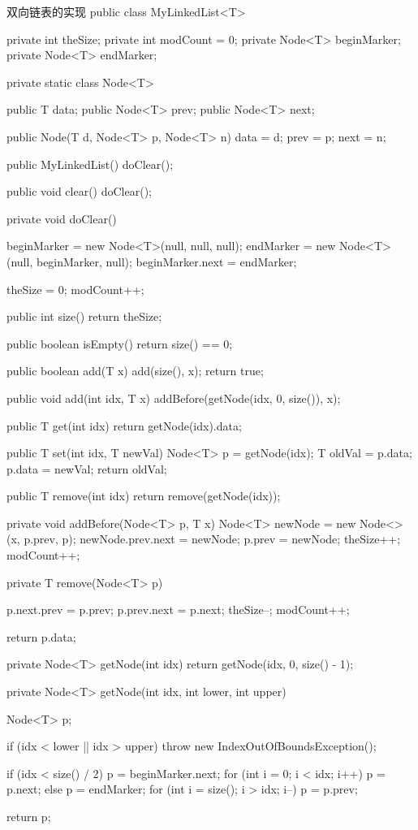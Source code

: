 \documentclass[oneside,10pt,fontset=none]{ctexbook}
\numberwithin{definition}{chapter}
\numberwithin{theorem}{chapter}
\numberwithin{lemma}{chapter}
\begin{document}
\begin{myjava}{}{双向链表的实现}{}
public class MyLinkedList<T> {
    private int theSize;
    private int modCount = 0;
    private Node<T> beginMarker;
    private Node<T> endMarker; 

    private static class Node<T> {
        public T data;
        public Node<T> prev;
        public Node<T> next;

        public Node(T d, Node<T> p, Node<T> n) {
            data = d;
            prev = p;
            next = n;
        }
    }

    public MyLinkedList() {
        doClear();
    }

    public void clear() {
        doClear();
    }

    private void doClear() {
        beginMarker = new Node<T>(null, null, null);
        endMarker = new Node<T>(null, beginMarker, null);
        beginMarker.next = endMarker;

        theSize = 0;
        modCount++;
    }

    public int size() {
        return theSize;
    }

    public boolean isEmpty() {
        return size() == 0;
    }

    public boolean add(T x) {
        add(size(), x);
        return true;
    }

    public void add(int idx, T x) {
        addBefore(getNode(idx, 0, size()), x);
    }

    public T get(int idx) {
        return getNode(idx).data;
    }

    public T set(int idx, T newVal) {
        Node<T> p = getNode(idx);
        T oldVal = p.data;
        p.data = newVal;
        return oldVal;
    }

    public T remove(int idx) {
        return remove(getNode(idx));
    }

    private void addBefore(Node<T> p, T x) {
        Node<T> newNode = new Node<>(x, p.prev, p);
        newNode.prev.next = newNode;
        p.prev = newNode;
        theSize++;
        modCount++;
    }

    private T remove(Node<T> p) {
        p.next.prev = p.prev;
        p.prev.next = p.next;
        theSize--;
        modCount++;

        return p.data;
    }
    
    private Node<T> getNode(int idx) {
        return getNode(idx, 0, size() - 1);
    }

    private Node<T> getNode(int idx, int lower, int upper) {
        Node<T> p;

        if (idx < lower || idx > upper)
            throw new IndexOutOfBoundsException();

        if (idx < size() / 2) {
            p = beginMarker.next;
            for (int i = 0; i < idx; i++)
                p = p.next;
        } else {
            p = endMarker;
            for (int i = size(); i > idx; i--)
                p = p.prev;
        }

        return p;
    }
}
\end{myjava}
\end{document}
